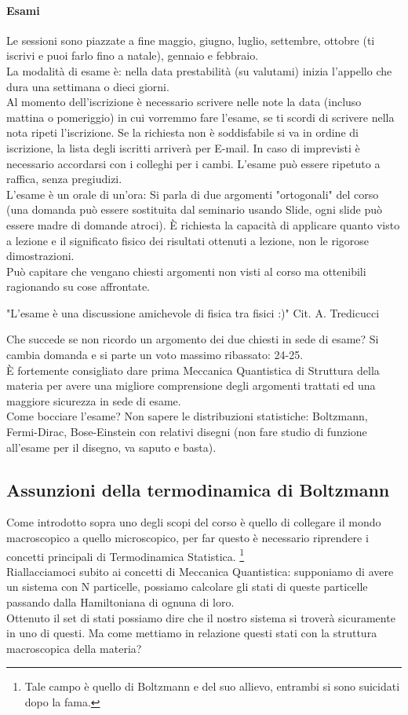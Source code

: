 \paragraph{Esami}%
Le sessioni sono piazzate a fine maggio, giugno, luglio, settembre, ottobre (ti iscrivi e puoi farlo fino a natale), gennaio e febbraio. \\
La modalità di esame è: nella data prestabilità (su valutami) inizia l'appello che dura una settimana o dieci giorni.\\
Al momento dell'iscrizione è necessario scrivere nelle note la data (incluso mattina o pomeriggio) in cui vorremmo fare l'esame, se ti scordi di scrivere nella nota ripeti l'iscrizione. Se la richiesta non è soddisfabile si va in ordine di iscrizione, la lista degli iscritti arriverà per E-mail. In caso di imprevisti è necessario accordarsi con i colleghi per i cambi. L'esame può essere ripetuto a raffica, senza pregiudizi.\\
L'esame è un orale di un'ora: Si parla di due argomenti "ortogonali" del corso (una domanda può essere sostituita dal seminario usando Slide, ogni slide può essere madre di domande atroci). È richiesta la  capacità di applicare quanto visto a lezione e il significato fisico dei risultati ottenuti a lezione, non le rigorose dimostrazioni. \\
Può capitare che vengano chiesti argomenti non visti al corso ma ottenibili ragionando su cose affrontate. 
\begin{center}
	"L'esame è una discussione amichevole di fisica tra fisici :)" \quad \quad Cit. A. Tredicucci
\end{center}
Che succede se non ricordo un argomento dei due chiesti in sede di esame? Si cambia domanda e si parte un voto massimo ribassato: 24-25.\\
È fortemente consigliato dare prima Meccanica Quantistica di Struttura della materia per avere una migliore comprensione degli argomenti trattati ed una maggiore sicurezza in sede di esame.\\
Come bocciare l'esame? Non sapere le distribuzioni statistiche: Boltzmann, Fermi-Dirac, Bose-Einstein con relativi disegni (non fare studio di funzione all'esame per il disegno, va saputo e basta).

\subsection{Assunzioni della termodinamica di Boltzmann}
Come introdotto sopra uno degli scopi del corso è quello di collegare il mondo macroscopico a quello microscopico, per far questo è necessario riprendere i concetti principali di Termodinamica Statistica.
\footnote{Tale campo è quello di Boltzmann e del suo allievo, entrambi si sono suicidati dopo la fama.}\\
Riallacciamoci subito ai concetti di Meccanica Quantistica: supponiamo di avere un sistema con N particelle, possiamo calcolare gli stati di queste particelle passando dalla Hamiltoniana di ognuna di loro. \\
Ottenuto il set di stati possiamo dire che il nostro sistema si troverà sicuramente in uno di questi. Ma come mettiamo in relazione questi stati con la struttura macroscopica della materia?

